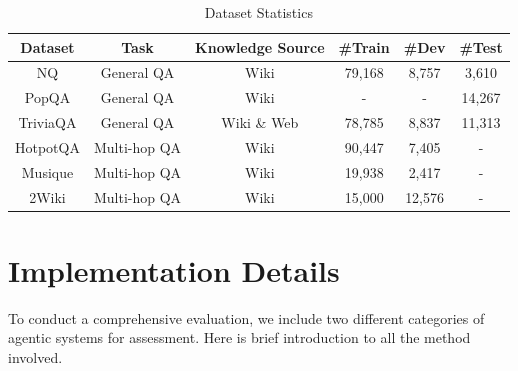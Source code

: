 \begin{table}[!h]
\caption{Dataset Statistics}
\label{tab:dataset}
\begin{tabular}{c|c|c|ccc}
\hline
Dataset  & Task         & Knowledge Source & \#Train                                               & \#Dev                                                & \#Test                                           \\ \hline
NQ       & General QA   & Wiki             & 79,168                                                & 8,757                                                & 3,610                                            \\
PopQA    & General QA   & Wiki             & -                                                     & -                                                    & 14,267                                           \\
TriviaQA & General QA   & Wiki \& Web   & 78,785   & 8,837 & 11,313                                           \\
HotpotQA & Multi-hop QA & Wiki             & 90,447                                                & 7,405                                                & -                                                \\
Musique  & Multi-hop QA & Wiki             & 19,938                                                &  2,417 &  - \\
2Wiki    & Multi-hop QA & Wiki             & 15,000                                                & 12,576                                               & -                                                \\ \hline
\end{tabular}
\end{table}
\section{Implementation Details}
\label{app:b}
To conduct a comprehensive evaluation, we include two different categories of agentic systems for assessment. Here is brief introduction to all the method involved.
